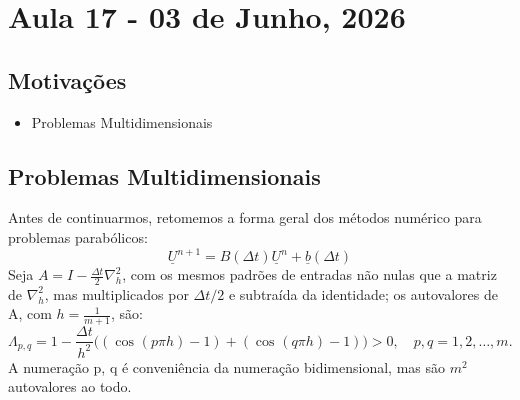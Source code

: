 \documentclass[../differential_methods.tex]{subfiles}
\begin{document}
\section{Aula 17 - 03 de Junho, 2026}
\subsection{Motivações}
\begin{itemize}
	\item Problemas Multidimensionais
\end{itemize}
\subsection{Problemas Multidimensionais}
Antes de continuarmos, retomemos a forma geral dos métodos numérico para problemas parabólicos:
\[
	\boxed{\underline{U}^{n+1} = B(\Delta t)\underline{U}^{n} + \underline{b}(\Delta t)}
\]
Seja \(A = I - \frac{\Delta t}{2}\nabla_{h}^{2}\), com os mesmos padrões de entradas não nulas que a matriz de \(\nabla_{h}^{2}\), mas multiplicados por \(\Delta t/2\) e subtraída da identidade; os autovalores de A, com \(\displaystyle h = \frac{1}{m+1}\), são:
\[
	\Lambda_{p, q} = 1 - \frac{\Delta t}{h^{2}}\biggl((\cos^{}{(p\pi h)}-1) + (\cos^{}{(q\pi h)}-1)\biggr) > 0, \quad p, q = 1, 2, \dotsc , m.
\]
A numeração p, q é conveniência da numeração bidimensional, mas são \(m^{2}\) autovalores ao todo.
\end{document}
